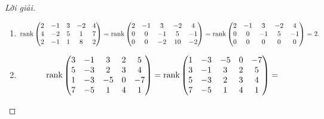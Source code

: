 \begin{proof}[Lời giải]
    \begin{enumerate}[label = (\alph*)]
        \item
              \begingroup{}
              \allowdisplaybreaks{}
              \begin{gather*}
                  \text{rank}\begin{pmatrix}
                      2 & -1 & 3 & -2 & 4 \\
                      4 & -2 & 5 & 1  & 7 \\
                      2 & -1 & 1 & 8  & 2
                  \end{pmatrix}
                  =\text{rank}\begin{pmatrix}
                      2 & -1 & 3  & -2 & 4  \\
                      0 & 0  & -1 & 5  & -1 \\
                      0 & 0  & -2 & 10 & -2
                  \end{pmatrix}
                  =\text{rank}\begin{pmatrix}
                      2 & -1 & 3  & -2 & 4  \\
                      0 & 0  & -1 & 5  & -1 \\
                      0 & 0  & 0  & 0  & 0
                  \end{pmatrix}
                  = 2.
              \end{gather*}
              \endgroup{}
        \item
              \begingroup{}
              \allowdisplaybreaks{}
              \begin{gather*}
                  \rank\begin{pmatrix}
                      3 & -1 & 3  & 2 & 5  \\
                      5 & -3 & 2  & 3 & 4  \\
                      1 & -3 & -5 & 0 & -7 \\
                      7 & -5 & 1  & 4 & 1
                  \end{pmatrix} =
                  \rank\begin{pmatrix}
                      1 & -3 & -5 & 0 & -7 \\
                      3 & -1 & 3  & 2 & 5  \\
                      5 & -3 & 2  & 3 & 4  \\
                      7 & -5 & 1  & 4 & 1
                  \end{pmatrix} =

\end{gather*}
\end{enumerate}
\end{proof}
